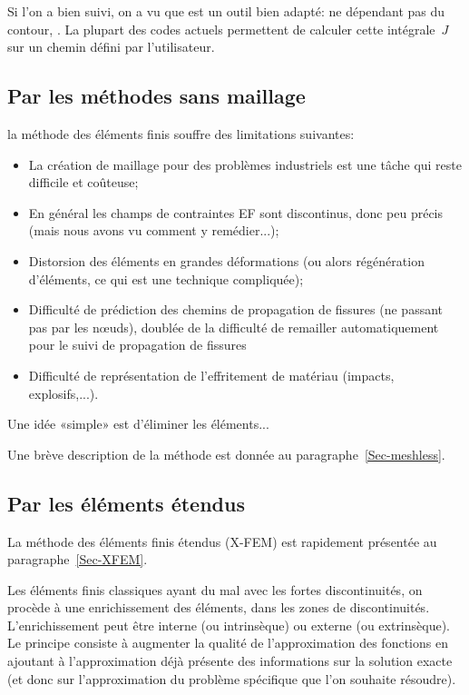 \medskip
Si l'on a bien suivi, on a vu que  est un outil bien adapté: ne dépendant pas du contour, . La plupart des codes actuels permettent de calculer cette intégrale~$J$ sur un chemin défini par l'utilisateur.



\medskip
\subsection{Par les méthodes sans maillage}

la méthode des éléments finis souffre des limitations suivantes:
\begin{itemize}
  \item La création de maillage pour des problèmes industriels est une tâche qui reste
	difficile et coûteuse;
  \item En général les champs de contraintes EF sont discontinus, donc peu précis (mais
	nous avons vu comment y remédier...);
  \item Distorsion des éléments en grandes déformations (ou alors régénération
	d'éléments, ce qui est une technique compliquée);
  \item Difficulté de prédiction des chemins de propagation de fissures (ne passant pas par les nœuds), doublée de la difficulté de remailler automatiquement pour le suivi de propagation de fissures
  \item Difficulté de représentation de l'effritement de matériau (impacts, explosifs,...).
\end{itemize}
Une idée «simple» est d'éliminer les éléments...

\medskip
Une brève description de la méthode est donnée au paragraphe~\ref{Sec-meshless}.


\medskip
\subsection{Par les éléments étendus}

La méthode des éléments finis étendus (X-FEM) est rapidement présentée au paragraphe~\ref{Sec-XFEM}.

\medskip
Les éléments finis classiques ayant du mal avec les fortes discontinuités, on procède à une enrichissement des éléments, dans les zones de discontinuités. L'enrichissement peut être interne (ou intrinsèque) ou externe (ou extrinsèque). Le principe consiste à augmenter la qualité de l'approximation des fonctions en ajoutant à l'approximation déjà présente des informations sur la solution exacte (et donc sur l'approximation du problème spécifique que l'on souhaite résoudre).



